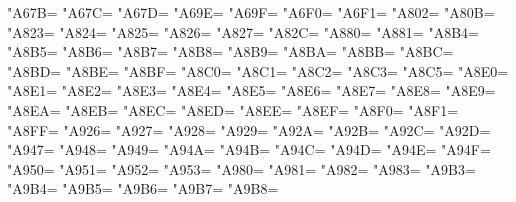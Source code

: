 \XeTeXcharclass"A67B=\KclassCM
\XeTeXcharclass"A67C=\KclassCM
\XeTeXcharclass"A67D=\KclassCM
\XeTeXcharclass"A69E=\KclassCM
\XeTeXcharclass"A69F=\KclassCM
\XeTeXcharclass"A6F0=\KclassCM
\XeTeXcharclass"A6F1=\KclassCM
\XeTeXcharclass"A802=\KclassCM
\XeTeXcharclass"A80B=\KclassCM
\XeTeXcharclass"A823=\KclassCM
\XeTeXcharclass"A824=\KclassCM
\XeTeXcharclass"A825=\KclassCM
\XeTeXcharclass"A826=\KclassCM
\XeTeXcharclass"A827=\KclassCM
\XeTeXcharclass"A82C=\KclassCM
\XeTeXcharclass"A880=\KclassCM
\XeTeXcharclass"A881=\KclassCM
\XeTeXcharclass"A8B4=\KclassCM
\XeTeXcharclass"A8B5=\KclassCM
\XeTeXcharclass"A8B6=\KclassCM
\XeTeXcharclass"A8B7=\KclassCM
\XeTeXcharclass"A8B8=\KclassCM
\XeTeXcharclass"A8B9=\KclassCM
\XeTeXcharclass"A8BA=\KclassCM
\XeTeXcharclass"A8BB=\KclassCM
\XeTeXcharclass"A8BC=\KclassCM
\XeTeXcharclass"A8BD=\KclassCM
\XeTeXcharclass"A8BE=\KclassCM
\XeTeXcharclass"A8BF=\KclassCM
\XeTeXcharclass"A8C0=\KclassCM
\XeTeXcharclass"A8C1=\KclassCM
\XeTeXcharclass"A8C2=\KclassCM
\XeTeXcharclass"A8C3=\KclassCM
\XeTeXcharclass"A8C5=\KclassCM
\XeTeXcharclass"A8E0=\KclassCM
\XeTeXcharclass"A8E1=\KclassCM
\XeTeXcharclass"A8E2=\KclassCM
\XeTeXcharclass"A8E3=\KclassCM
\XeTeXcharclass"A8E4=\KclassCM
\XeTeXcharclass"A8E5=\KclassCM
\XeTeXcharclass"A8E6=\KclassCM
\XeTeXcharclass"A8E7=\KclassCM
\XeTeXcharclass"A8E8=\KclassCM
\XeTeXcharclass"A8E9=\KclassCM
\XeTeXcharclass"A8EA=\KclassCM
\XeTeXcharclass"A8EB=\KclassCM
\XeTeXcharclass"A8EC=\KclassCM
\XeTeXcharclass"A8ED=\KclassCM
\XeTeXcharclass"A8EE=\KclassCM
\XeTeXcharclass"A8EF=\KclassCM
\XeTeXcharclass"A8F0=\KclassCM
\XeTeXcharclass"A8F1=\KclassCM
\XeTeXcharclass"A8FF=\KclassCM
\XeTeXcharclass"A926=\KclassCM
\XeTeXcharclass"A927=\KclassCM
\XeTeXcharclass"A928=\KclassCM
\XeTeXcharclass"A929=\KclassCM
\XeTeXcharclass"A92A=\KclassCM
\XeTeXcharclass"A92B=\KclassCM
\XeTeXcharclass"A92C=\KclassCM
\XeTeXcharclass"A92D=\KclassCM
\XeTeXcharclass"A947=\KclassCM
\XeTeXcharclass"A948=\KclassCM
\XeTeXcharclass"A949=\KclassCM
\XeTeXcharclass"A94A=\KclassCM
\XeTeXcharclass"A94B=\KclassCM
\XeTeXcharclass"A94C=\KclassCM
\XeTeXcharclass"A94D=\KclassCM
\XeTeXcharclass"A94E=\KclassCM
\XeTeXcharclass"A94F=\KclassCM
\XeTeXcharclass"A950=\KclassCM
\XeTeXcharclass"A951=\KclassCM
\XeTeXcharclass"A952=\KclassCM
\XeTeXcharclass"A953=\KclassCM
\XeTeXcharclass"A980=\KclassCM
\XeTeXcharclass"A981=\KclassCM
\XeTeXcharclass"A982=\KclassCM
\XeTeXcharclass"A983=\KclassCM
\XeTeXcharclass"A9B3=\KclassCM
\XeTeXcharclass"A9B4=\KclassCM
\XeTeXcharclass"A9B5=\KclassCM
\XeTeXcharclass"A9B6=\KclassCM
\XeTeXcharclass"A9B7=\KclassCM
\XeTeXcharclass"A9B8=\KclassCM
